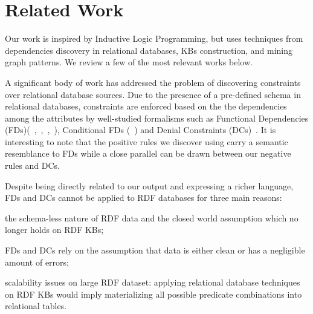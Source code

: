 \section{Related Work} \label{sec:krd_related}

Our work is inspired by Inductive Logic Programming, but uses techniques from dependencies discovery in relational databases, KBs construction, and mining graph patterns. 
We review a few of the most relevant works below.

A significant body of work has addressed the problem of discovering constraints over relational database sources. 
Due to the presence of a pre-defined schema in relational databases, constraints are enforced based on the the dependencies among the attributes by well-studied formalisms such as 
Functional Dependencies (FDs)(~\cite{abiteboul1995foundations},~\cite{abedjan2014dfd},~\cite{huhtala1999tane},~\cite{wyss2001fastfds}), Conditional FDs (~\cite{fan2011discovering}) 
and Denial Constraints (DCs)~\cite{bertossi2011database,chu2013holistic}. It is interesting to note that the positive rules we discover using \krd carry 
a semantic resemblance to FDs while 
a close parallel can be drawn between our negative rules and DCs.
%

Despite being directly related to our output and expressing a richer language, FDs and DCs cannot be applied to RDF databases for three main reasons:
\begin{inparaenum}[\itshape(i)]
	\item the schema-less nature of RDF data and the closed world assumption which no longer holds on RDF KBs;
	\item FDs and DCs rely on the assumption that data is either clean or has a negligible amount of errors;
	\item scalability issues on large RDF dataset: applying relational database techniques on RDF KBs would imply materializing all possible predicate combinations into relational tables.
\end{inparaenum}

